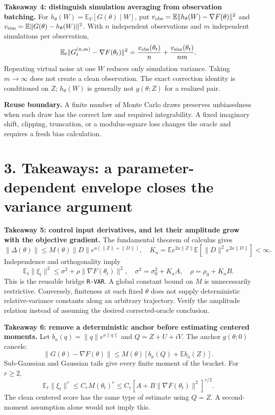\documentclass[11pt]{article}
\newcommand{\E}{\mathbb E}\newcommand{\R}{\mathbb R}\newcommand{\C}{\mathbb C}
\newcommand{\norm}[1]{\lVert#1\rVert}
\newcommand{\ID}[1]{\texttt{#1}}
\begin{document}
\textbf{Takeaway 4: distinguish simulation averaging from observation batching.}
For $h_\theta(W)=\E_V[G(\theta)\mid W]$, put
$v_{\rm obs}=\E\norm{h_\theta(W)-\nabla F(\theta)}^2$ and
$v_{\rm sim}=\E\norm{G(\theta)-h_\theta(W)}^2$.
With $n$ independent observations and $m$ independent simulations per observation,
\[
\E_t\norm{G_t^{(n,m)}-\nabla F(\theta_t)}^2
=\frac{v_{\rm obs}(\theta_t)}n+\frac{v_{\rm sim}(\theta_t)}{nm}.
\]
Repeating virtual noise at one $W$ reduces only simulation variance. Taking $m\to\infty$ does not create a clean observation. The exact correction identity is conditioned on $Z$; $h_\theta(W)$ is generally not $g(\theta;Z)$ for a realized pair.

\textbf{Reuse boundary.} A finite number of Monte Carlo draws preserves unbiasedness when each draw has the correct law and required integrability. A fixed imaginary shift, clipping, truncation, or a modulus-square loss changes the oracle and requires a fresh bias calculation.

\clearpage
\section*{3. Takeaways: a parameter-dependent envelope closes the variance argument}
\textbf{Takeaway 5: control input derivatives, and let their amplitude grow with the objective gradient.}
The fundamental theorem of calculus gives
\[
\norm{\Delta(\theta)}\le M(\theta)\norm D e^{a(\norm Z+\norm D)},
\quad
K_a=\E e^{2a\norm Z}\E[\norm D^2e^{2a\norm D}]<\infty.
\]
Independence and orthogonality imply
\[
\E_t\norm{\xi_t}^2\le\sigma^2+\rho\norm{\nabla F(\theta_t)}^2,
\quad \sigma^2=\sigma_0^2+K_aA,\quad \rho=\rho_0+K_aB.
\]
This is the reusable bridge \ID{R-VAR}. A global constant bound on $M$ is unnecessarily restrictive. Conversely, finiteness at each fixed $\theta$ does not supply deterministic relative-variance constants along an arbitrary trajectory. Verify the amplitude relation instead of assuming the desired corrected-oracle conclusion.

\textbf{Takeaway 6: remove a deterministic anchor before estimating centered moments.}
Let $b_a(q)=\norm q e^{a\norm q}$ and $Q=Z+U+iV$. The anchor $g(\theta;0)$ cancels:
\[
\norm{G(\theta)-\nabla F(\theta)}
\le M(\theta)[b_a(Q)+\E b_a(Z)].
\]
Sub-Gaussian and Gaussian tails give every finite moment of the bracket. For $r\ge2$,
\[
\E_t\norm{\xi_t}^r\le C_r M(\theta_t)^r
\le C_r[A+B\norm{\nabla F(\theta_t)}^2]^{r/2}.
\]
The clean centered score has the same type of estimate using $Q=Z$.
A second-moment assumption alone would not imply this.
\end{document}
